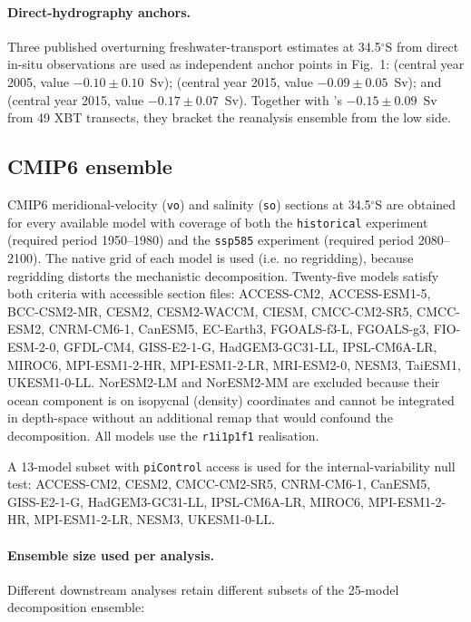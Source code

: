 \documentclass[11pt,a4paper]{article}
\begin{document}
\paragraph{Direct-hydrography anchors.} Three published overturning freshwater-transport estimates at 34.5$^\circ$S from direct in-situ observations are used as independent anchor points in Fig.~1: \citet{GarzoliMatano2011} (central year 2005, value $-0.10\pm0.10$~Sv); \citet{Meinen2018} (central year 2015, value $-0.09\pm0.05$~Sv); and \citet{Kersale2020} (central year 2015, value $-0.17\pm0.07$~Sv). Together with \citet{ArumiPlanas2024}'s $-0.15\pm0.09$~Sv from 49 XBT transects, they bracket the reanalysis ensemble from the low side.

\subsection*{CMIP6 ensemble}

CMIP6 meridional-velocity (\texttt{vo}) and salinity (\texttt{so}) sections at 34.5$^\circ$S are obtained for every available model with coverage of both the \texttt{historical} experiment (required period 1950--1980) and the \texttt{ssp585} experiment (required period 2080--2100). The native grid of each model is used (i.e. no regridding), because regridding distorts the mechanistic decomposition. Twenty-five models satisfy both criteria with accessible section files: ACCESS-CM2, ACCESS-ESM1-5, BCC-CSM2-MR, CESM2, CESM2-WACCM, CIESM, CMCC-CM2-SR5, CMCC-ESM2, CNRM-CM6-1, CanESM5, EC-Earth3, FGOALS-f3-L, FGOALS-g3, FIO-ESM-2-0, GFDL-CM4, GISS-E2-1-G, HadGEM3-GC31-LL, IPSL-CM6A-LR, MIROC6, MPI-ESM1-2-HR, MPI-ESM1-2-LR, MRI-ESM2-0, NESM3, TaiESM1, UKESM1-0-LL. NorESM2-LM and NorESM2-MM are excluded because their ocean component is on isopycnal (density) coordinates and cannot be integrated in depth-space without an additional remap that would confound the decomposition. All models use the \texttt{r1i1p1f1} realisation.

A 13-model subset with \texttt{piControl} access is used for the internal-variability null test: ACCESS-CM2, CESM2, CMCC-CM2-SR5, CNRM-CM6-1, CanESM5, GISS-E2-1-G, HadGEM3-GC31-LL, IPSL-CM6A-LR, MIROC6, MPI-ESM1-2-HR, MPI-ESM1-2-LR, NESM3, UKESM1-0-LL.

\paragraph{Ensemble size used per analysis.} Different downstream analyses retain different subsets of the 25-model decomposition ensemble:
\end{document}
